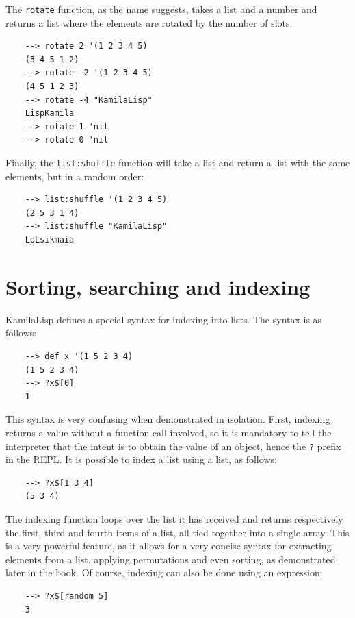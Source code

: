 The \verb|rotate| function, as the name suggests, takes a list and a number and returns a list where the elements are rotated by the number of slots:

\begin{Verbatim}
    --> rotate 2 '(1 2 3 4 5)
    (3 4 5 1 2)
    --> rotate -2 '(1 2 3 4 5)
    (4 5 1 2 3)
    --> rotate -4 "KamilaLisp"
    LispKamila
    --> rotate 1 'nil
    --> rotate 0 'nil
\end{Verbatim}

Finally, the \verb|list:shuffle| function will take a list and return a list with the same elements, but in a random order:

\begin{Verbatim}
    --> list:shuffle '(1 2 3 4 5)
    (2 5 3 1 4)
    --> list:shuffle "KamilaLisp"
    LpLsikmaia
\end{Verbatim}

\section{Sorting, searching and indexing}

KamilaLisp defines a special syntax for indexing into lists. The syntax is as follows:

\begin{Verbatim}
    --> def x '(1 5 2 3 4)
    (1 5 2 3 4)
    --> ?x$[0]
    1
\end{Verbatim}

This syntax is very confusing when demonstrated in isolation. First, indexing returns a value without a function call involved, so it is mandatory to tell the interpreter that the intent is to obtain the value of an object, hence the \verb|?| prefix in the REPL. It is possible to index a list using a list, as follows:

\begin{Verbatim}
    --> ?x$[1 3 4]
    (5 3 4)
\end{Verbatim}

The indexing function loops over the list it has received and returns respectively the first, third and fourth items of a list, all tied together into a single array. This is a very powerful feature, as it allows for a very concise syntax for extracting elements from a list, applying permutations and even sorting, as demonstrated later in the book. Of course, indexing can also be done using an expression:

\begin{Verbatim}
    --> ?x$[random 5]
    3
\end{Verbatim}


